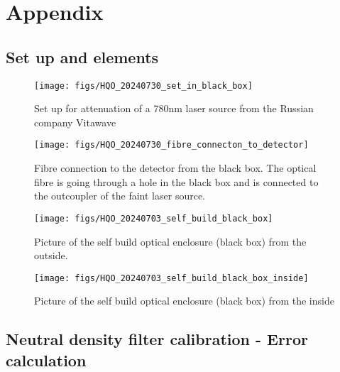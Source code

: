 \chapter{Appendix}
\label{sec:app}

\section{Set up and elements}\label{sec:Set_up_and_Elements_appendix}

\begin{figure}
    \centering
    \texttt{[image: figs/HQO\_20240730\_set\_in\_black\_box]}
    \caption{Set up for attenuation of a 780nm laser source from the Russian company Vitawave}
    \label{fig: faint_laser_source_full_set_up_real_life}
\end{figure}

\begin{figure}
    \centering
    \texttt{[image: figs/HQO\_20240730\_fibre\_connecton\_to\_detector]}
    \caption{Fibre connection to the detector from the black box. The optical fibre is going through a hole in the black box and is connected to the
    outcoupler of the faint laser source.}
    \label{fig: fibre_connection_real_life}
\end{figure}

\begin{figure}
    \centering
    \texttt{[image: figs/HQO\_20240703\_self\_build\_black\_box]}
    \caption{Picture of the self build optical enclosure (black box) from the outside.}
    \label{fig: black_box_outside}
\end{figure}

\begin{figure}
    \centering
    \texttt{[image: figs/HQO\_20240703\_self\_build\_black\_box\_inside]}
    \caption{Picture of the self build optical enclosure (black box) from the inside}
    \label{fig:black_box_inside}
\end{figure}

\FloatBarrier

\section{Neutral density filter calibration - Error calculation}\label{sec:ND_filter_calibration_appendix}


